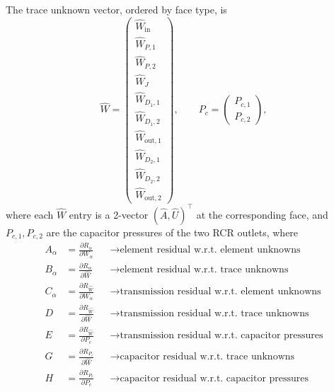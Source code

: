 \documentclass[11pt]{article}
\begin{document}
The trace unknown vector, ordered by face type, is
\begin{equation}
\widehat{W}
=
\begin{pmatrix}
\widehat{W}_{\mathrm{in}}   \\
\widehat{W}_{P,1}           \\
\widehat{W}_{P,2}           \\
\widehat{W}_{J}             \\
\widehat{W}_{D_1,1}         \\
\widehat{W}_{D_1,2}         \\
\widehat{W}_{\mathrm{out},1}\\
\widehat{W}_{D_2,1}         \\
\widehat{W}_{D_2,2}         \\
\widehat{W}_{\mathrm{out},2}
\end{pmatrix},
\qquad
P_c
=
\begin{pmatrix}
P_{c,1}\\
P_{c,2}
\end{pmatrix},
\end{equation}
where each $\widehat{W}$ entry is a 2-vector $(\widehat{A}, \widehat{U})^\top$
at the corresponding face, and $P_{c,1},P_{c,2}$ are the capacitor pressures of
the two RCR outlets, where
\begin{align}
A_\alpha
&= \frac{\partial R_\alpha}{\partial W_\alpha}
& &\longrightarrow \text{element residual w.r.t. element unknowns}
\\[6pt]
B_\alpha
&= \frac{\partial R_\alpha}{\partial \widehat{W}}
& &\longrightarrow \text{element residual w.r.t. trace unknowns}
\\[6pt]
C_\alpha
&= \frac{\partial R_{\widehat{W}}}{\partial W_\alpha}
& &\longrightarrow \text{transmission residual w.r.t. element unknowns}
\\[6pt]
D
&= \frac{\partial R_{\widehat{W}}}{\partial \widehat{W}}
& &\longrightarrow \text{transmission residual w.r.t. trace unknowns}
\\[6pt]
E
&= \frac{\partial R_{\widehat{W}}}{\partial P_c}
& &\longrightarrow \text{transmission residual w.r.t. capacitor pressures}
\\[6pt]
G
&= \frac{\partial R_{P_c}}{\partial \widehat{W}}
& &\longrightarrow \text{capacitor residual w.r.t. trace unknowns}
\\[6pt]
H
&= \frac{\partial R_{P_c}}{\partial P_c}
& &\longrightarrow \text{capacitor residual w.r.t. capacitor pressures}
\end{align}
\end{document}
